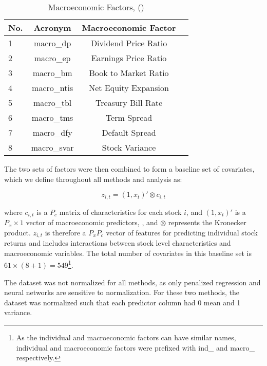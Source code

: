 \documentclass{article}
\begin{document}
\begin{table}
	\caption{Macroeconomic Factors, (\cite{welch_comprehensive_2008})}
	\label{macro_factors}
	\begin{center}
		\begin{tabular}{lccc} \hline
			No. & Acronym & Macroeconomic Factor \\ \hline
			1 & macro\_dp & Dividend Price Ratio \\
			2 & macro\_ep & Earnings Price Ratio \\
			3 & macro\_bm & Book to Market Ratio \\
			4 & macro\_ntis & Net Equity Expansion \\
			5 & macro\_tbl & Treasury Bill Rate \\
			6 & macro\_tms & Term Spread \\
			7 & macro\_dfy & Default Spread \\
			8 & macro\_svar & Stock Variance \\ \hline
		\end{tabular}
	\end{center}
\end{table}

The two sets of factors were then combined to form a baseline set of covariates, which we define throughout all methods and analysis as:

\begin{equation}
z_{i,t} = (1, x_t)' \otimes c_{i, t}
\end{equation}

where $c_{i,t}$ is a $P_c$ matrix of characteristics for each stock $i$, and $(1, x_t)'$ is a $P_x \times 1$ vector of macroeconomic predictors, , and $\otimes$ represents the Kronecker product. $z_{i,t}$ is therefore a $P_x P_c$ vector of features for predicting individual stock returns and includes interactions between stock level characteristics and macroeconomic variables. The total number of covariates in this baseline set is $61 \times (8 + 1) = 549$\footnote{As the individual and macroeconomic factors can have similar names, individual and macroeconomic factors were prefixed with ind\_ and macro\_ respectively.}.


The dataset was not normalized for all methods, as only penalized regression and neural networks are sensitive to normalization. For these two methods, the dataset was normalized such that each predictor column had 0 mean and 1 variance.
\end{document}
